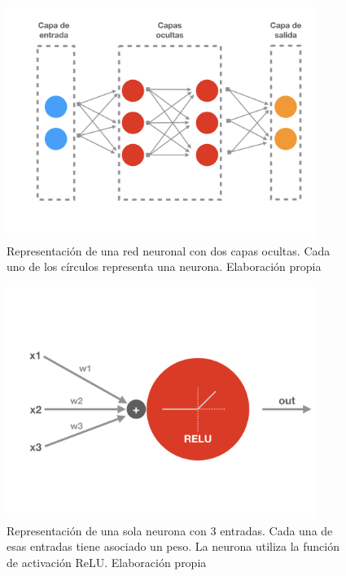\documentclass[
  12pt,
  spanish,
  a4paperpaper,
]{report}
\begin{document}
\begin{figure}
\centering
\includegraphics[width=0.9\textwidth,height=\textheight]{source/figures/neural-network.png}
\caption{Representación de una red neuronal con dos capas ocultas. Cada
uno de los círculos representa una neurona. Elaboración propia
\label{neural-network}}
\end{figure}

\begin{figure}
\centering
\includegraphics[width=0.9\textwidth,height=\textheight]{source/figures/single-neuron.png}
\caption{Representación de una sola neurona con 3 entradas. Cada una de
esas entradas tiene asociado un peso. La neurona utiliza la función de
activación ReLU. Elaboración propia \label{single-neuron}}
\end{figure}
\end{document}
